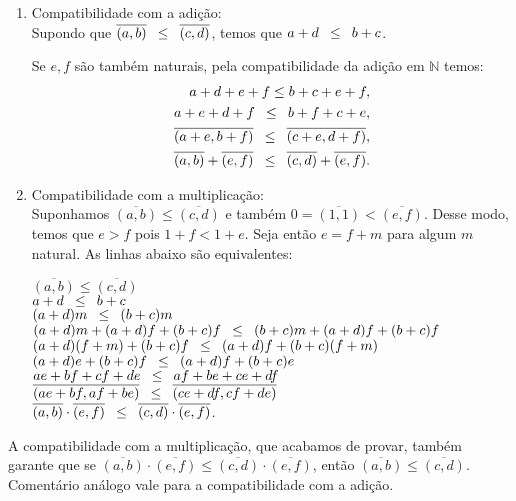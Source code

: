\documentclass[../main.tex]{subfiles}
\begin{document}
\begin{dem}
\begin{enumerate}[label=(\roman*)]
        \item Compatibilidade com a adição: \\
        Supondo que $\overline{(a,b)} \hspace{8pt} {\leq} \hspace{8pt} \overline{(c,d)}$, temos que $a+d \hspace{8pt} {\leq} \hspace{8pt} b+c$. 

            Se $e, f$ são também naturais, pela compatibilidade da adição em $\mathbb{N}$ temos: \\
        \begin{align*}    
            a+d +e+f \leq b+c+e+f, \\ 
            a + e + d +f \hspace{8pt} {\leq} \hspace{8pt} b + f + c + e, \\
            \overline{(a+e,b+f)} \hspace{8pt} {\leq} \hspace{8pt} \overline{(c+e, d+f)}, \\ 
            \overline{(a,b)} + \overline{(e,f)} \hspace{8pt} {\leq} \hspace{8pt} \overline{(c,d)} + \overline{(e,f)}.
        \end{align*}

        
        \item Compatibilidade com a multiplicação: \\
        Suponhamos $\overline{(a,b)} \leq \overline{(c,d)}$ e também $0 = \overline{(1,1)} < \overline{(e,f)}$.
        Desse modo, temos que $e > f$ pois $1+f < 1+e$. Seja então $e = f+m$ para algum $m$ natural. As linhas abaixo são equivalentes:
        \begin{center}
            $\overline{(a,b)} \leq \overline{(c,d)}$\\
            $a+d \hspace{8pt} {\leq} \hspace{8pt} b+c  $\\
            $(a+d)m \hspace{8pt} {\leq} \hspace{8pt} (b+c)m $ \\
            $(a+d)m + (a+d)f + (b+c)f \hspace{8pt} {\leq} \hspace{8pt} (b+c)m + (a+d)f + (b+c)f$ \\
            $(a+d)(f+m) + (b+c)f \hspace{8pt} {\leq} \hspace{8pt} (a+d)f + (b+c)(f+m)$ \\
            $(a+d)e + (b+c)f \hspace{8pt} {\leq} \hspace{8pt} (a+d)f + (b+c)e$ \\
            $ae+bf + cf+de \hspace{8pt} {\leq} \hspace{8pt} af+be + ce+df  $\\
            $\overline{(ae+bf, af+be)} \hspace{8pt} {\leq} \hspace{8pt} \overline{(ce+df, cf+de)}  $ \\           
            $\overline{(a,b)} \cdot \overline{(e,f)} \hspace{8pt} {\leq} \hspace{8pt} \overline{(c,d)} \cdot \overline{(e,f)}$.
        \end{center}        
        
    \end{enumerate}
\end{dem}
\begin{obs}
    A compatibilidade com a multiplicação, que acabamos de provar, também garante que se $\overline{(a,b)} \cdot \overline{(e,f)} 
    \leq \overline{(c,d)} \cdot \overline{(e,f)}$, então $\overline{(a,b)} \leq \overline{(c,d)}$. Comentário análogo vale para a compatibilidade com a adição.
\end{obs}
\end{document}

